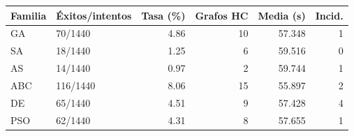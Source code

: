 \begin{tabularx}{\linewidth}{lYrrrr}
\toprule
Familia & Éxitos/intentos & Tasa (\%) & Grafos HC & Media (s) & Incid. \\ \midrule
GA & 70/1440 & 4.86 & 10 & 57.348 & 1 \\
SA & 18/1440 & 1.25 & 6 & 59.516 & 0 \\
AS & 14/1440 & 0.97 & 2 & 59.744 & 1 \\
ABC & 116/1440 & 8.06 & 15 & 55.897 & 2 \\
DE & 65/1440 & 4.51 & 9 & 57.428 & 4 \\
PSO & 62/1440 & 4.31 & 8 & 57.655 & 1 \\
\bottomrule\end{tabularx}
